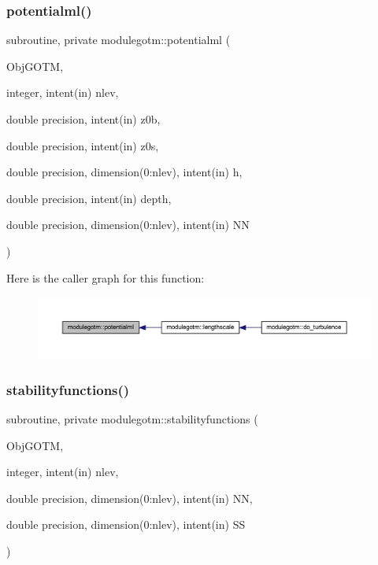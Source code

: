 \subsubsection{\texorpdfstring{potentialml()}{potentialml()}}
{\footnotesize\ttfamily subroutine, private modulegotm\+::potentialml (\begin{DoxyParamCaption}\item[{}]{Obj\+G\+O\+TM,  }\item[{integer, intent(in)}]{nlev,  }\item[{double precision, intent(in)}]{z0b,  }\item[{double precision, intent(in)}]{z0s,  }\item[{double precision, dimension(0\+:nlev), intent(in)}]{h,  }\item[{double precision, intent(in)}]{depth,  }\item[{double precision, dimension(0\+:nlev), intent(in)}]{NN }\end{DoxyParamCaption})\hspace{0.3cm}{\ttfamily [private]}}

Here is the caller graph for this function\+:\nopagebreak
\begin{figure}[H]
\begin{center}
\leavevmode
\includegraphics[width=350pt]{namespacemodulegotm_a2ac21e06e59e99b089466cd065b15ca3_icgraph}
\end{center}
\end{figure}
\mbox{\label{namespacemodulegotm_a0e2f0ad43d12c00ed95b6fdef24dc5eb}} 
\subsubsection{\texorpdfstring{stabilityfunctions()}{stabilityfunctions()}}
{\footnotesize\ttfamily subroutine, private modulegotm\+::stabilityfunctions (\begin{DoxyParamCaption}\item[{}]{Obj\+G\+O\+TM,  }\item[{integer, intent(in)}]{nlev,  }\item[{double precision, dimension(0\+:nlev), intent(in)}]{NN,  }\item[{double precision, dimension(0\+:nlev), intent(in)}]{SS }\end{DoxyParamCaption})\hspace{0.3cm}{\ttfamily [private]}}

